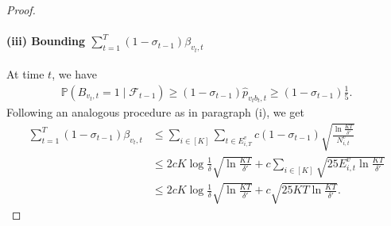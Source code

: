 \begin{proof}
    \paragraph{(iii) Bounding $\sum_{t=1}^T (1-\sigma_{t-1})\beta_{v_t,t}$}
    At time $t$, we have 
     \begin{align*}
         \mathbb{P}(B_{v_t,t} = 1 \mid \mathcal{F}_{t-1} ) \ge(1- \sigma_{t-1})\widehat{p}_{v_t b_t,t} \ge (1-\sigma_{t-1})\frac{1}{5}.
     \end{align*}
    Following an analogous procedure as in paragraph (i), we get
    \begin{align*}
        \sum_{t=1}^T (1-\sigma_{t-1})\beta_{v_{t},t} &\le \sum_{i \in [K]} \sum_{t \in E_{i,T}^v} c(1-\sigma_{t-1})\sqrt{\frac{\ln \frac{KT}{\delta'}}{N_{i,t}^v}}  \\
        &\le 2cK\log \frac{1}{\delta} \sqrt{ \ln \frac{KT}{\delta'}} + c\sum_{i \in [K]}\sqrt{2 5E_{i,t}^v \ln \frac{KT}{\delta'}} \\
        &\le 2cK\log \frac{1}{\delta} \sqrt{\ln \frac{KT}{\delta'}} + c\sqrt{25 KT \ln \frac{KT}{\delta'}}.
    \end{align*}

\end{proof}

